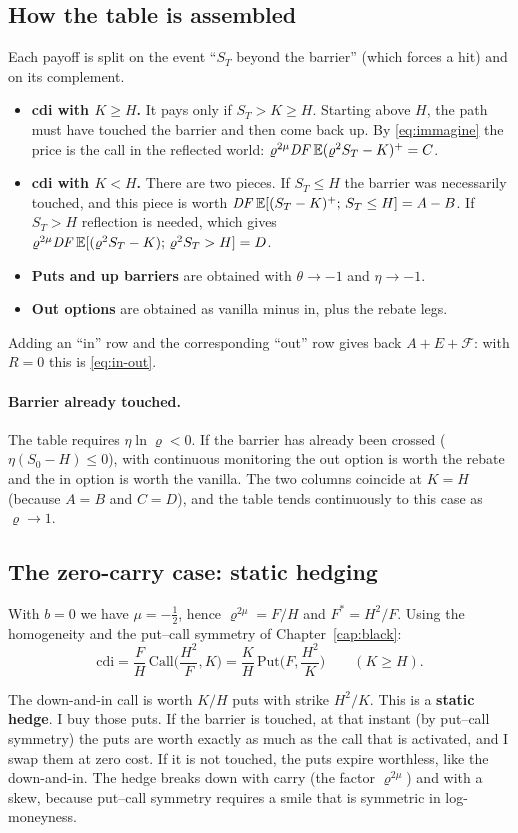 \subsection{How the table is assembled}
Each payoff is split on the event ``$S_T$ beyond the barrier'' (which forces a hit) and on its complement.
\begin{itemize}
\item \textbf{cdi with $K\ge H$.} It pays only if $S_T>K\ge H$. Starting above $H$, the path must have touched the
barrier and then come back up. By \eqref{eq:immagine} the price is the call in the reflected world:
$\varrho^{2\mu}\mathit{DF}\,\mathbb{E}(\varrho^2S_T-K)^+=C$.
\item \textbf{cdi with $K<H$.} There are two pieces. If $S_T\le H$ the barrier was necessarily touched, and this
piece is worth $\mathit{DF}\,\mathbb{E}[(S_T-K)^+;\,S_T\le H]=A-B$. If $S_T>H$ reflection is needed, which gives
$\varrho^{2\mu}\mathit{DF}\,\mathbb{E}[(\varrho^2S_T-K);\,\varrho^2S_T>H]=D$.
\item \textbf{Puts and up barriers} are obtained with $\theta\to-1$ and $\eta\to-1$.
\item \textbf{Out options} are obtained as vanilla minus in, plus the rebate legs.
\end{itemize}
Adding an ``in'' row and the corresponding ``out'' row gives back $A+E+\mathcal F$: with $R=0$ this is
\eqref{eq:in-out}.

\paragraph{Barrier already touched.} The table requires $\eta\ln\varrho<0$. If the barrier has already been crossed
($\eta(S_0-H)\le0$), with continuous monitoring the out option is worth the rebate and the in option is worth the
vanilla. The two columns coincide at $K=H$ (because $A=B$ and $C=D$), and the table tends continuously to this case as
$\varrho\to1$.

\subsection{The zero-carry case: static hedging}
With $b=0$ we have $\mu=-\frac12$, hence $\varrho^{2\mu}=F/H$ and $F^*=H^2/F$. Using the homogeneity and the
put--call symmetry of Chapter~\ref{cap:black}:
\begin{equation}
\text{cdi}=\frac FH\,\mathrm{Call}\Big(\frac{H^2}{F},K\Big)=\frac KH\,\mathrm{Put}\Big(F,\frac{H^2}{K}\Big)\qquad(K\ge H).
\end{equation}
\begin{idea}
The down-and-in call is worth $K/H$ puts with strike $H^2/K$. This is a \textbf{static hedge}. I buy those puts. If
the barrier is touched, at that instant (by put--call symmetry) the puts are worth exactly as much as the call that is
activated, and I swap them at zero cost. If it is not touched, the puts expire worthless, like the down-and-in. The
hedge breaks down with carry (the factor $\varrho^{2\mu}$) and with a skew, because put--call symmetry requires a smile
that is symmetric in log-moneyness.
\end{idea}

